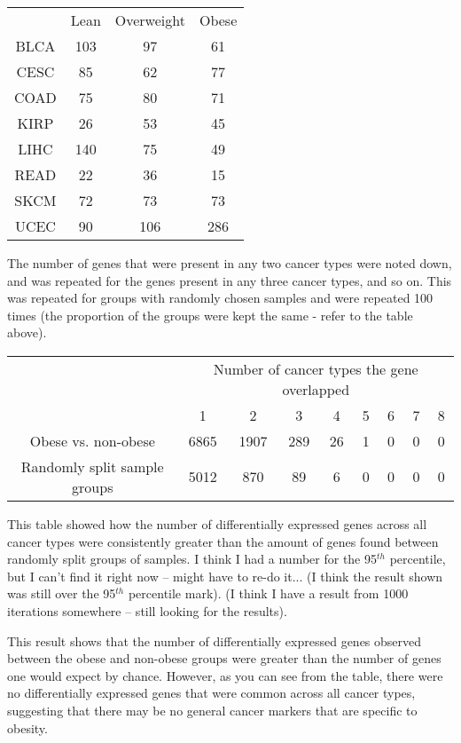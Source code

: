 \documentclass[a4paper, 11pt]{article}
\begin{document}
\begin{center}
	\begin{tabular}{cccc}
             & Lean & Overweight & Obese \\
		BLCA & 103    & 97         & 61 \\
		CESC & 85     & 62         & 77 \\
		COAD & 75     & 80         & 71 \\
		KIRP & 26     & 53         & 45 \\
		LIHC & 140    & 75         & 49 \\
		READ & 22     & 36         & 15 \\
		SKCM & 72     & 73         & 73 \\
		UCEC & 90     & 106        & 286 \\
	\end{tabular}
\end{center}

The number of genes that were present in any two cancer types were noted down, and was repeated for the genes present in any three cancer types, and so on.
This was repeated for groups with randomly chosen samples and were repeated 100 times (the proportion of the groups were kept the same - refer to the table above).

\begin{center}
	\begin{tabular}{ccccccccc}
		& \multicolumn{8}{c}{Number of cancer types the gene overlapped} \\
                                     &    1 &    2 &   3 &  4 & 5 & 6 & 7 & 8 \\
		\midrule
		         Obese vs. non-obese & 6865 & 1907 & 289 & 26 & 1 & 0 & 0 & 0 \\
		Randomly split sample groups & 5012 &  870 &  89 &  6 & 0 & 0 & 0 & 0 \\
	\end{tabular}
\end{center}

This table showed how the number of differentially expressed genes across all cancer types were consistently greater  than the amount of genes found between randomly split groups of samples.
I think I had a number for the 95$^{th}$ percentile, but I can't find it right now -- might have to re-do it... (I think the result shown was still over the 95$^{th}$ percentile mark).
(I think I have a result from 1000 iterations somewhere -- still looking for the results).

This result shows that the number of differentially expressed genes observed between the obese and non-obese groups were greater than the number of genes one would expect by chance.
However, as you can see from the table, there were no differentially expressed genes that were common across all cancer types, suggesting that there may be no general cancer markers that are specific to obesity.\\
\end{document}
